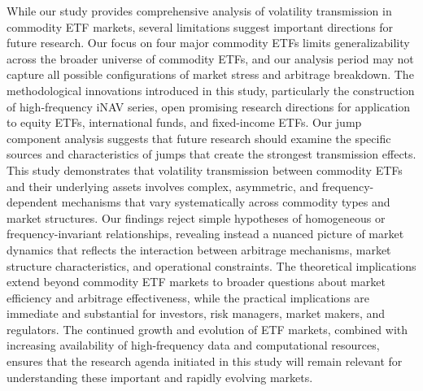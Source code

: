 While our study provides comprehensive analysis of volatility transmission in commodity ETF markets, several limitations suggest important directions for future research. Our focus on four major commodity ETFs limits generalizability across the broader universe of commodity ETFs, and our analysis period may not capture all possible configurations of market stress and arbitrage breakdown. The methodological innovations introduced in this study, particularly the construction of high-frequency iNAV series, open promising research directions for application to equity ETFs, international funds, and fixed-income ETFs. Our jump component analysis suggests that future research should examine the specific sources and characteristics of jumps that create the strongest transmission effects.
This study demonstrates that volatility transmission between commodity ETFs and their underlying assets involves complex, asymmetric, and frequency-dependent mechanisms that vary systematically across commodity types and market structures. Our findings reject simple hypotheses of homogeneous or frequency-invariant relationships, revealing instead a nuanced picture of market dynamics that reflects the interaction between arbitrage mechanisms, market structure characteristics, and operational constraints. The theoretical implications extend beyond commodity ETF markets to broader questions about market efficiency and arbitrage effectiveness, while the practical implications are immediate and substantial for investors, risk managers, market makers, and regulators. The continued growth and evolution of ETF markets, combined with increasing availability of high-frequency data and computational resources, ensures that the research agenda initiated in this study will remain relevant for understanding these important and rapidly evolving markets.